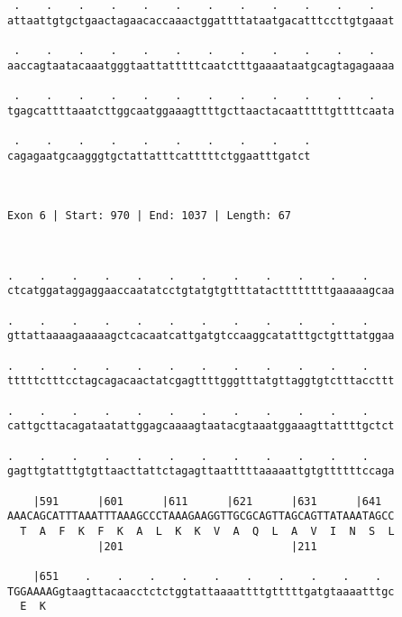 \documentclass{article}
\begin{document}
\begin{Verbatim}
 .    .    .    .    .    .    .    .    .    .    .    .   
attaattgtgctgaactagaacaccaaactggattttataatgacatttccttgtgaaat
                                                            
 .    .    .    .    .    .    .    .    .    .    .    .   
aaccagtaatacaaatgggtaattatttttcaatctttgaaaataatgcagtagagaaaa
                                                            
 .    .    .    .    .    .    .    .    .    .    .    .   
tgagcattttaaatcttggcaatggaaagttttgcttaactacaatttttgttttcaata
                                                            
 .    .    .    .    .    .    .    .    .    .
cagagaatgcaagggtgctattatttcatttttctggaatttgatct
                                               
                                               
 
Exon 6 | Start: 970 | End: 1037 | Length: 67



.    .    .    .    .    .    .    .    .    .    .    .    
ctcatggataggaggaaccaatatcctgtatgtgttttatacttttttttgaaaaagcaa
                                                            
.    .    .    .    .    .    .    .    .    .    .    .    
gttattaaaagaaaaagctcacaatcattgatgtccaaggcatatttgctgtttatggaa
                                                            
.    .    .    .    .    .    .    .    .    .    .    .    
tttttctttcctagcagacaactatcgagttttgggtttatgttaggtgtctttaccttt
                                                            
.    .    .    .    .    .    .    .    .    .    .    .    
cattgcttacagataatattggagcaaaagtaatacgtaaatggaaagttattttgctct
                                                            
.    .    .    .    .    .    .    .    .    .    .    .    
gagttgtatttgtgttaacttattctagagttaatttttaaaaattgtgttttttccaga
                                                            
    |591      |601      |611      |621      |631      |641  
AAACAGCATTTAAATTTAAAGCCCTAAAGAAGGTTGCGCAGTTAGCAGTTATAAATAGCC
  T  A  F  K  F  K  A  L  K  K  V  A  Q  L  A  V  I  N  S  L
              |201                          |211            
  
    |651    .    .    .    .    .    .    .    .    .    .  
TGGAAAAGgtaagttacaacctctctggtattaaaattttgtttttgatgtaaaatttgc
  E  K                                                      
                                                            

\end{Verbatim}
\end{document}

